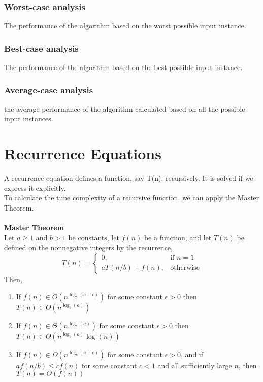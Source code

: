 \documentclass[a4paper]{article}
\begin{document}
\subsubsection{Worst-case analysis}
The performance of the algorithm based on the worst possible input instance.
\subsubsection{Best-case analysis}
The performance of the algorithm based on the best possible input instance.
\subsubsection{Average-case analysis}
the average performance of the algorithm calculated based on all the possible input instances.

\section{Recurrence Equations}
A recurrence equation defines a function, say T(n), recursively.
It is solved if we express it explicitly.\\
To calculate the time complexity of a recursive function, we can apply the Master Theorem.\\\\
\textbf{Master Theorem}\\
Let $a \ge 1$ and $b>1$ be constants, let $f(n)$ be a function, and let $T(n)$ be defined on the nonnegative integers by the recurrence, 
\[
	T(n)=
	\begin{cases}
		0, & \text{if } n=1\\
		aT(n/b) + f(n), & \text{otherwise}
	\end{cases}
\]
Then,
\begin{enumerate}
	\item If $f(n) \in O(n^{\log_b(a-\epsilon)})$ for some constant $\epsilon > 0$ then $T(n) \in \Theta(n^{\log_b(a)})$
	\item If $f(n) \in \Theta(n^{\log_b(a)})$ for some constant $\epsilon > 0$ then $T(n) \in \Theta(n^{\log_b(a)}\log(n))$
	\item If $f(n) \in \Omega(n^{\log_b(a+\epsilon)})$ for some constant $\epsilon > 0$, and if $af(n/b)\le cf(n)$ for some constant $c<1$ and all sufficiently large $n$, then $T(n) = \Theta(f(n))$
\end{enumerate}
\end{document}
